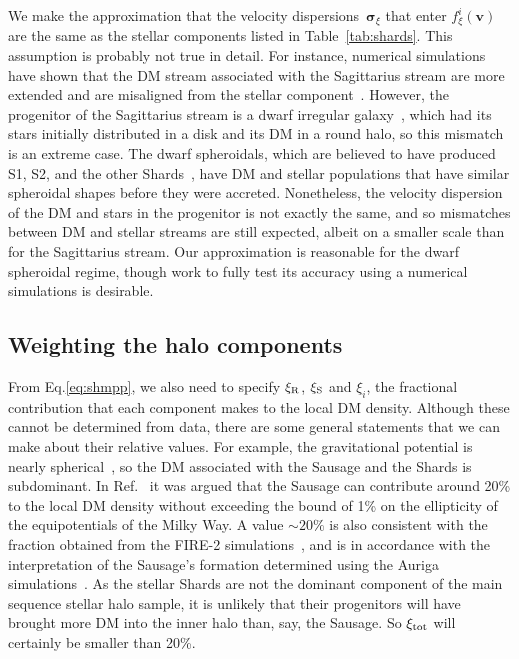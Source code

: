 \documentclass[prd,10pt,twocolumn,showpacs,nofootinbib,aps,superscriptaddress,preprintnumbers]{revtex4-1}
\newcommand{\vbf}{\mathbf{v}}
\newcommand{\Gaia}{\!{\it Gaia}\xspace}
\begin{document}
  We make the approximation that the velocity
  dispersions~$\boldsymbol{\sigma}_\xi$ that enter $f^i_\xi(\vbf)$ are
  the same as the stellar components listed in Table~\ref{tab:shards}.
  This assumption is probably not true in detail.  For instance, numerical
  simulations have shown that the DM stream associated with the
  Sagittarius stream are more extended and are misaligned from the
  stellar component~\cite{Purcell:2012sh,Purcell:2011nf}.  However, the
  progenitor of the Sagittarius stream is a dwarf irregular
  galaxy~\cite{NO10}, which had its stars initially distributed in a
  disk and its DM in a round halo, so this mismatch is an extreme case.
  The dwarf spheroidals, which are believed to have produced S1, S2, and
  the other Shards~\cite{Myeong:2017skt}, have DM and stellar
  populations that have similar spheroidal shapes before they were
  accreted.  Nonetheless, the velocity dispersion of the DM and stars in
  the progenitor is not exactly the same, and so mismatches between DM
  and stellar streams are still expected, albeit on a smaller scale than
  for the Sagittarius stream. Our approximation is reasonable
  for the dwarf spheroidal regime, though work to fully test its
  accuracy using a numerical simulations is desirable.





  \subsection{Weighting the halo components \label{sec:weight}}

  From Eq.\eqref{eq:shmpp}, we also need to specify $\xi_{\rm{R}}$,
  $\xi_{\rm{S}}$ and $\xi_i$, the fractional contribution that each
  component makes to the local DM density.  Although these cannot
  be determined from \Gaia data, there are some general statements that
  we can make about their relative values.  For example, the
  gravitational potential is nearly spherical~\cite{Wegg:2018voc}, so
  the DM associated with the Sausage and the Shards is subdominant. In
  Ref.~\cite{Evans:2018bqy} it was argued that the \Gaia Sausage can
  contribute around 20\% to the local DM density without
  exceeding the bound of 1\% on the ellipticity of the equipotentials of
  the Milky Way. A value $\sim 20\%$ is also consistent with the
  fraction obtained from the FIRE-2
  simulations~\cite{Necib:2018igl}, and is in accordance with the interpretation of the Sausage's formation determined using the Auriga simulations~\cite{2019MNRAS.484.4471F,Bozorgnia:2019mjk}.
    As the stellar Shards are not the dominant component of
  the main sequence stellar halo sample, it is unlikely that their
  progenitors will have brought more DM into the inner halo
  than, say, the Sausage. So $\xi_{\rm tot}$ will certainly be smaller
  than 20\%.
\end{document}
